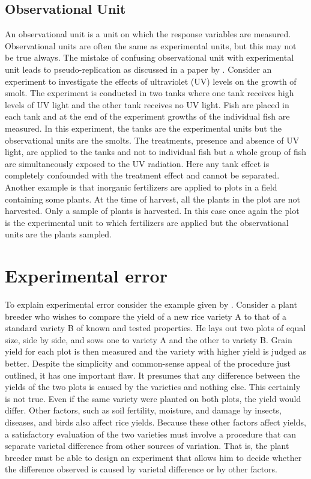 \documentclass[
]{book}
\begin{document}
\hypertarget{observational-unit}{%
\subsection{Observational Unit}\label{observational-unit}}

An observational unit is a unit on which the response variables are measured. Observational units are often the same as experimental units, but this may not be true always. The mistake of confusing observational unit with experimental unit leads to pseudo-replication as discussed in a paper by \citep{hurlbert}. Consider an experiment to investigate the effects of ultraviolet (UV) levels on the growth of smolt. The experiment is conducted in two tanks where one tank receives high levels of UV light and the other tank receives no UV light. Fish are placed in each tank and at the end of the experiment growths of the individual fish are measured. In this experiment, the tanks are the experimental units but the observational units are the smolts. The treatments, presence and absence of UV light, are applied to the tanks and not to individual fish but a whole group of fish are simultaneously exposed to the UV radiation. Here any tank effect is completely confounded with the treatment effect and cannot be separated. Another example is that inorganic fertilizers are applied to plots in a field containing some plants. At the time of harvest, all the plants in the plot are not harvested. Only a sample of plants is harvested. In this case once again the plot is the experimental unit to which fertilizers are applied but the observational units are the plants sampled.

\hypertarget{experimental-error}{%
\section{Experimental error}\label{experimental-error}}

To explain experimental error consider the example given by \citep{gomez}. Consider a plant breeder who wishes to compare the yield of a new rice variety A to that of a standard variety B of known and tested properties. He lays out two plots of equal size, side by side, and sows one to variety A and the other to variety B. Grain yield for each plot is then measured and the variety with higher yield is judged as better. Despite the simplicity and common-sense appeal of the procedure just outlined, it has one important flaw. It presumes that any difference between the yields of the two plots is caused by the varieties and nothing else. This certainly is not true. Even if the same variety were planted on both plots, the yield would differ. Other factors, such as soil fertility, moisture, and damage by insects, diseases, and birds also affect rice yields. Because these other factors affect yields, a satisfactory evaluation of the two varieties must involve a procedure that can separate varietal difference from other sources of variation. That is, the plant breeder must be able to design an experiment that allows him to decide whether the difference observed is caused by varietal difference or by other factors.
\end{document}
